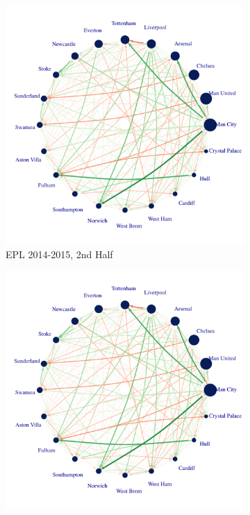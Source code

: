 \documentclass[12pt,a4paper,twoside,openany]{book}
\makeatletter
\def\maxwidth{ %
  \ifdim\Gin@nat@width>\linewidth
    \linewidth
  \else
    \Gin@nat@width
  \fi
}
\newenvironment{knitrout}{}{} %
\makeatother
\begin{document}
\begin{figure}[H]
\begin{subfigure}{0.4\textwidth}
\begin{knitrout}
{\centering \includegraphics[width=\maxwidth]{figure/unnamed-chunk-6-1} 

}



\end{knitrout}
\caption{EPL 2014-2015, 2nd Half} 
\end{subfigure}
\hspace*{\fill}

\hspace*{\fill}
\begin{subfigure}{0.40\textwidth}
\begin{knitrout}
\color{fgcolor}

{\centering \includegraphics[width=\maxwidth]{figure/unnamed-chunk-7-1} 

}
\end{knitrout}
\end{subfigure}
\end{figure}
\end{document}
